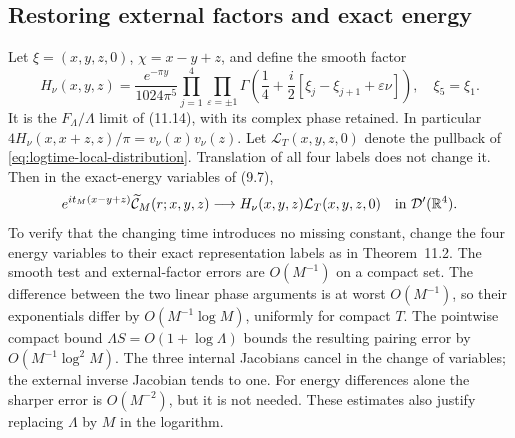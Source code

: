 \subsection{Restoring external factors and exact energy}
Let $\xi=(x,y,z,0)$, $\chi=x-y+z$, and define the smooth factor
\begin{equation}
 H_\nu(x,y,z)=\frac{e^{-\pi y}}{1024\pi^5}
 \prod_{j=1}^{4}\prod_{\varepsilon=\pm1}
 \Gamma\left(\frac14+\frac i2
       [\xi_j-\xi_{j+1}+\varepsilon\nu]\right),
 \quad \xi_5=\xi_1.
 \label{eq:logtime-H}
\end{equation}
It is the $F_\Lambda/\Lambda$ limit of (11.14), with its complex phase
retained. In particular
$4H_\nu(x,x+z,z)/\pi=v_\nu(x)v_\nu(z)$.
Let $\mathcal L_T(x,y,z,0)$ denote the pullback of
\eqref{eq:logtime-local-distribution}. Translation of all four labels
does not change it. Then in the exact-energy variables of (9.7),
\begin{equation}
 e^{it_M(x-y+z)}\widetilde{\mathcal C}_M(r;x,y,z)
 \longrightarrow H_\nu(x,y,z)\mathcal L_T(x,y,z,0)
 \quad\hbox{in }\mathcal D'(\mathbb R^4).
 \label{eq:logtime-energy-limit}
\end{equation}
To verify that the changing time introduces no missing constant, change
the four energy variables to their exact representation labels as in
Theorem~11.2. The smooth test and external-factor errors are $O(M^{-1})$
on a compact set. The difference between the two linear phase arguments
is at worst $O(M^{-1})$, so their exponentials differ by
$O(M^{-1}\log M)$, uniformly for compact $T$. The pointwise compact
bound $\Lambda S=O(1+\log\Lambda)$ bounds the resulting pairing error
by $O(M^{-1}\log^2M)$. The three internal Jacobians cancel in the change
of variables; the external inverse Jacobian tends to one. For energy
differences alone the sharper error is $O(M^{-2})$, but it is not needed.
These estimates also justify replacing $\Lambda$ by $M$ in the logarithm.

